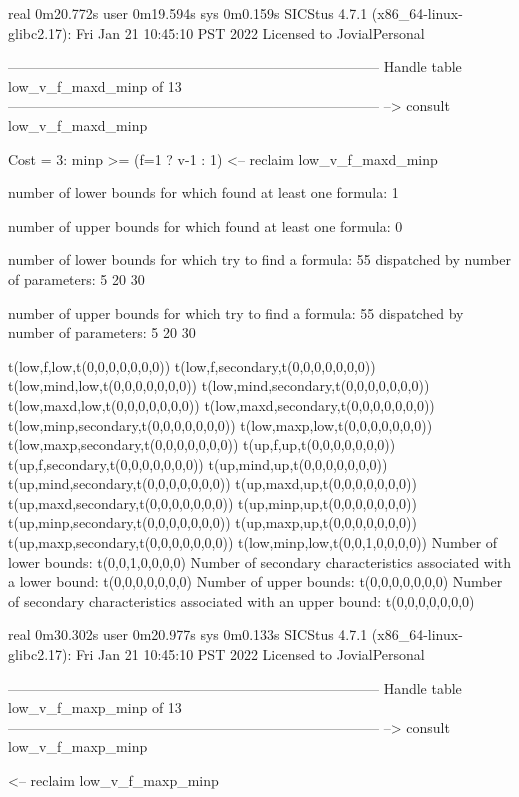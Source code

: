 real	0m20.772s
user	0m19.594s
sys	0m0.159s
SICStus 4.7.1 (x86_64-linux-glibc2.17): Fri Jan 21 10:45:10 PST 2022
Licensed to JovialPersonal


--------------------------------------------------------------------------------
Handle table low_v_f_maxd_minp of 13
--------------------------------------------------------------------------------
--> consult low_v_f_maxd_minp

Cost =  3:  minp >= (f=1 ? v-1 : 1)
<-- reclaim low_v_f_maxd_minp

number of lower bounds for which found at least one formula: 1

number of upper bounds for which found at least one formula: 0

number of lower bounds for which try to find a formula: 55
dispatched by number of parameters: 5  20  30

number of upper bounds for which try to find a formula: 55
dispatched by number of parameters: 5  20  30

t(low,f,low,t(0,0,0,0,0,0,0))
t(low,f,secondary,t(0,0,0,0,0,0,0))
t(low,mind,low,t(0,0,0,0,0,0,0))
t(low,mind,secondary,t(0,0,0,0,0,0,0))
t(low,maxd,low,t(0,0,0,0,0,0,0))
t(low,maxd,secondary,t(0,0,0,0,0,0,0))
t(low,minp,secondary,t(0,0,0,0,0,0,0))
t(low,maxp,low,t(0,0,0,0,0,0,0))
t(low,maxp,secondary,t(0,0,0,0,0,0,0))
t(up,f,up,t(0,0,0,0,0,0,0))
t(up,f,secondary,t(0,0,0,0,0,0,0))
t(up,mind,up,t(0,0,0,0,0,0,0))
t(up,mind,secondary,t(0,0,0,0,0,0,0))
t(up,maxd,up,t(0,0,0,0,0,0,0))
t(up,maxd,secondary,t(0,0,0,0,0,0,0))
t(up,minp,up,t(0,0,0,0,0,0,0))
t(up,minp,secondary,t(0,0,0,0,0,0,0))
t(up,maxp,up,t(0,0,0,0,0,0,0))
t(up,maxp,secondary,t(0,0,0,0,0,0,0))
t(low,minp,low,t(0,0,1,0,0,0,0))
Number of lower bounds:                                             t(0,0,1,0,0,0,0)
Number of secondary characteristics associated with a lower bound:  t(0,0,0,0,0,0,0)
Number of upper bounds:                                             t(0,0,0,0,0,0,0)
Number of secondary characteristics associated with an upper bound: t(0,0,0,0,0,0,0)

real	0m30.302s
user	0m20.977s
sys	0m0.133s
SICStus 4.7.1 (x86_64-linux-glibc2.17): Fri Jan 21 10:45:10 PST 2022
Licensed to JovialPersonal


--------------------------------------------------------------------------------
Handle table low_v_f_maxp_minp of 13
--------------------------------------------------------------------------------
--> consult low_v_f_maxp_minp

<-- reclaim low_v_f_maxp_minp

